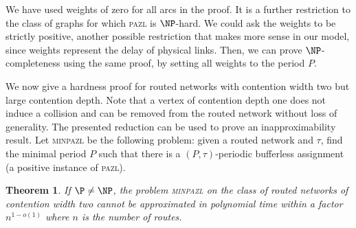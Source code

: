 \documentclass[a4paper,10pt]{journal}
\newtheorem{theorem}{Theorem}
\newcommand\pazl{\textsc{pazl}\xspace}
\newcommand\minpazl{\textsc{minpazl}\xspace}
\begin{document}
 We have used weights of zero for all arcs in the proof. It is a further restriction to the 
 class of graphs for which \pazl is $\NP$-hard. We could ask the weights to be strictly positive, another possible restriction that makes more sense in our model, since weights represent the delay of physical links. Then, we can prove $\NP$-completeness using the same proof, by setting all weights to the period $P$.

We now give a hardness proof for routed networks with contention width two but large contention depth. Note that a vertex of contention depth one does not induce a collision and can be removed from the routed network without loss of generality. The presented reduction can be used to prove an inapproximability result. Let \minpazl be the following problem: given a routed network and $\tau$, find the minimal period $P$ such that there is a $(P,\tau)$-periodic bufferless assignment (a positive instance of \pazl). 


\begin{theorem}\label{th:inapprox}
If $\P \neq \NP$, the problem \minpazl on the class of routed networks of contention width two cannot be approximated in polynomial time within a factor $n^{1-o(1)}$ where $n$ is the number of routes.
\end{theorem}
\end{document}
